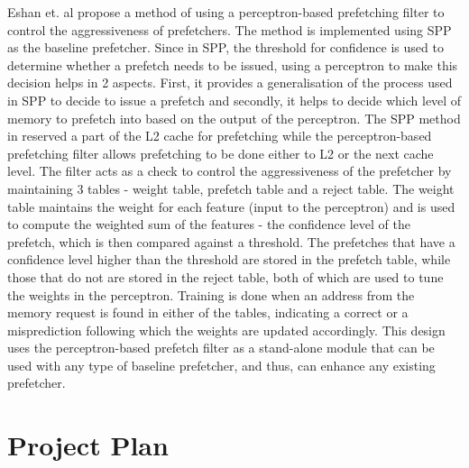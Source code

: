 \documentclass[conference]{IEEEtran}
\begin{document}
Eshan et. al propose a method of using a perceptron-based prefetching filter \cite{ppf} to control the aggressiveness of prefetchers. The method is implemented using SPP\cite{SPP} as the baseline prefetcher. Since in SPP, the threshold for confidence is used to determine whether a prefetch needs to be issued, using a perceptron to make this decision helps in 2 aspects. First, it provides a generalisation of the process used in SPP to decide to issue a prefetch and secondly, it helps to decide which level of memory to prefetch into based on the output of the perceptron. The SPP method in \cite{SPP} reserved a part of the L2 cache for prefetching while the perceptron-based prefetching filter allows prefetching to be done either to L2 or the next cache level. The filter acts as a check to control the aggressiveness of the prefetcher by maintaining 3 tables - weight table, prefetch table and a reject table. The weight table maintains the weight for each feature (input to the perceptron) and is used to compute the weighted sum of the features - the confidence level of the prefetch, which is then compared against a threshold. The prefetches that have a confidence level higher than the threshold are stored in the prefetch table, while those that do not are stored in the reject table, both of which are used to tune the weights in the perceptron. Training is done when an address from the memory request is found in either of the tables, indicating a correct or a misprediction following which the weights are updated accordingly. This design uses the perceptron-based prefetch filter as a stand-alone module that can be used with any type of baseline prefetcher, and thus, can enhance any existing prefetcher. 

\section{Project Plan}
\end{document}
